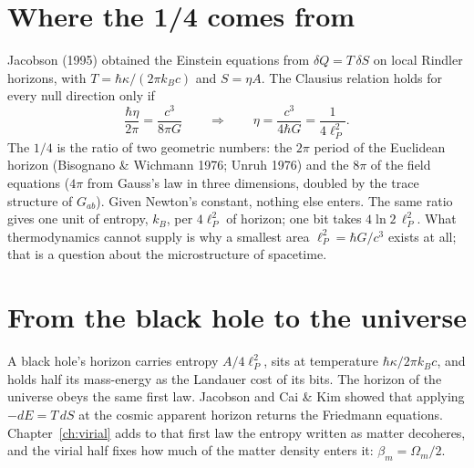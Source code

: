 \section{Where the 1/4 comes from}
Jacobson (1995) obtained the Einstein equations from $\delta Q=T\,\delta S$ on local Rindler horizons, with $T=\hbar\kappa/(2\pi k_Bc)$ and $S=\eta A$. The
Clausius relation holds for every null direction only if
\begin{equation}
\frac{\hbar\eta}{2\pi}=\frac{c^3}{8\pi G}\qquad\Longrightarrow\qquad\eta=\frac{c^3}{4\hbar G}=\frac{1}{4\ell_P^2}.
\end{equation}
The $1/4$ is the ratio of two geometric numbers: the $2\pi$ period of the Euclidean horizon (Bisognano \& Wichmann 1976; Unruh 1976) and the $8\pi$ of the
field equations ($4\pi$ from Gauss's law in three dimensions, doubled by the trace structure of $G_{ab}$). Given Newton's constant, nothing else enters.
The same ratio gives one unit of entropy, $k_B$, per $4\ell_P^2$ of horizon; one bit takes $4\ln2\,\ell_P^2$. What thermodynamics cannot supply is why a smallest area $\ell_P^2=\hbar G/c^3$
exists at all; that is a question about the microstructure of spacetime.

\section{From the black hole to the universe}
A black hole's horizon carries entropy $A/4\ell_P^2$, sits at temperature $\hbar\kappa/2\pi k_Bc$, and holds half its mass-energy as the Landauer cost of its
bits. The horizon of the universe obeys the same first law. Jacobson and Cai \& Kim showed that applying $-dE=T\,dS$ at the cosmic apparent horizon returns the
Friedmann equations. Chapter~\ref{ch:virial} adds to that first law the entropy written as matter decoheres, and the virial half fixes how much of the matter
density enters it: $\beta_m=\Omega_m/2$.

